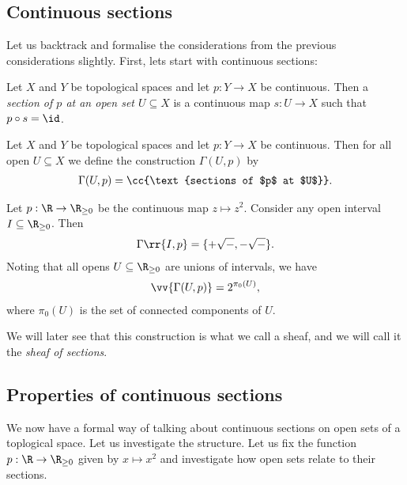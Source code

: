 \documentclass{article}
\begin{document}
\subsection{Continuous sections}

Let us backtrack and formalise the considerations from the previous
considerations slightly. First, lets start with continuous sections:

\begin{definition}
  Let $X$ and $Y$ be topological spaces and let $p:Y\to X$ be continuous.
  Then a \emph{section of $p$ at an open set $U\subseteq X$} is a continuous
  map $s:U\to X$ such that $p\circ s = \id$.
\end{definition}

\begin{definition}
  Let $X$ and $Y$ be topological spaces and let $p : Y \to X$ be continuous.
  Then for all open $U \subseteq X$ we define the construction $\Gamma(U, p)$ by
  \begin{align*}
    \Gamma(U, p) = \cc{\text{sections of $p$ at $U$}}.
  \end{align*}
\end{definition}

\begin{example}
  Let $p : \R \to \R_{\geq 0}$ be the continuous map $z \mapsto z^2$.
  Consider any open interval $I\subseteq\R_{\geq 0}$. Then
  \begin{align*}
    \Gamma\rr{I,p} = \{+\sqrt{-}, -\sqrt{-}\}.
  \end{align*}
  Noting that all opens $U\subseteq\R_{\geq 0}$ are unions of intervals,
  we have
  \begin{align*}
    \vv{\Gamma(U,p)} = 2^{\pi_0(U)},
  \end{align*}
  where $\pi_0(U)$ is the set of connected components of $U$.
\end{example}

We will later see that this construction is what we call a sheaf, and we will
call it the \emph{sheaf of sections}.

\subsection{Properties of continuous sections}

We now have a formal way of talking about continuous sections on
open sets of a toplogical space. Let us investigate the structure.
Let us fix the function $p:\R\to\R_{\geq 0}$ given by $x\mapsto x^2$
and investigate how open sets relate to their sections.
\end{document}
